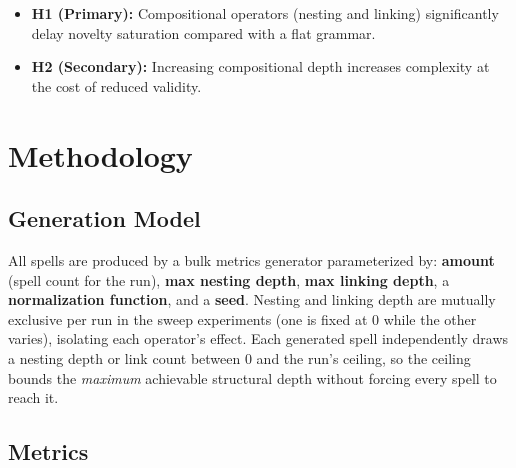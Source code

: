 \documentclass[]{article}
\begin{document}
        \begin{itemize}
            \item
                \textbf{H1 (Primary):} Compositional operators (nesting and linking) significantly delay novelty saturation compared with a flat grammar.
            \item
                \textbf{H2 (Secondary):} Increasing compositional depth increases complexity at the cost of reduced validity.
        \end{itemize}

        \section{Methodology}\label{methodology}

        \subsection{Generation Model}\label{generation-model}

        All spells are produced by a bulk metrics generator parameterized by: \textbf{amount} (spell count for the run), \textbf{max nesting depth}, \textbf{max linking depth}, a \textbf{normalization function}, and a \textbf{seed}. Nesting and linking depth are mutually exclusive per run in the sweep experiments (one is fixed at 0 while the other varies), isolating each operator's effect. Each generated spell independently draws a nesting depth or link count between 0 and the run's ceiling, so the ceiling bounds the \textit{maximum} achievable structural depth without forcing every spell to reach it.

        \subsection{Metrics}\label{metrics}
\end{document}
